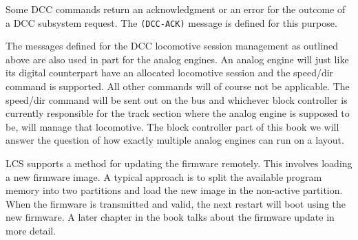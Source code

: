 Some DCC commands return an acknowledgment or an error for the outcome of a DCC subsystem request. The \texttt{(DCC-ACK)} message is defined for this purpose.

\begin{table}[ht!]
    \centering 
\end{table}


The messages defined for the DCC locomotive session management as outlined above are also used in part for the analog engines. An analog engine will just like its digital counterpart have an allocated locomotive session and the speed/dir command is supported. All other commands will of course not be applicable. The speed/dir command will be sent out on the bus and whichever block controller is currently responsible for the track section where the analog engine is supposed to be, will manage that locomotive. The block controller part of this book we will answer the question of how exactly multiple analog engines can run on a layout.


LCS supports a method for updating the firmware remotely. This involves loading a new firmware image. A typical approach is to split the available program memory into two partitions and load the new image in the non-active partition. When the firmware is transmitted and valid, the next restart will boot using the new firmware. A later chapter in the book talks about the firmware update in more detail.

